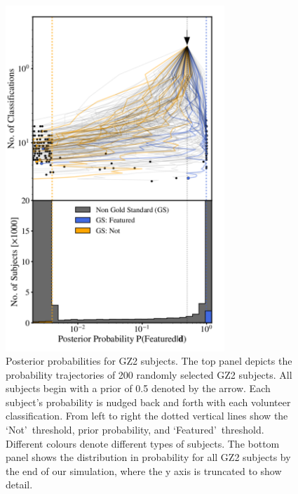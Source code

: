 \documentclass[twocolumn,  trackchanges,]{aastex6}%
\newcommand{\feat}{`Featured'}
\newcommand{\notfeat}{`Not'}
\begin{document}
\begin{figure}[t!] 
\centering
\includegraphics[width=3.25in]{f12.pdf}
\caption{Posterior probabilities for GZ2 subjects.  The top panel depicts the probability trajectories of 200 randomly selected GZ2 subjects. All subjects begin with a prior of 0.5 denoted by the arrow. Each subject's probability is nudged back and forth with each volunteer classification. From left to right the dotted vertical lines show the \notfeat~threshold, prior probability, and \feat~threshold. Different colours denote different types of subjects. The bottom panel shows the distribution in probability for all GZ2 subjects by the end of our simulation, where the y axis is truncated to show detail.  \label{fig: subject probabilities}}
\end{figure}
\end{document}
